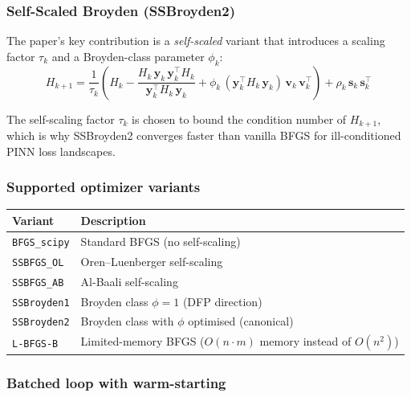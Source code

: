 \documentclass[11pt,a4paper]{article}
\begin{document}
\subsubsection*{Self-Scaled Broyden (SSBroyden2)}

The paper's key contribution is a \emph{self-scaled} variant that
introduces a scaling factor $\tau_k$ and a Broyden-class parameter
$\phi_k$:
\begin{equation}
  H_{k+1} = \frac{1}{\tau_k}\!\left(
    H_k
    - \frac{H_k\,\bm{y}_k\,\bm{y}_k^\top H_k}
           {\bm{y}_k^\top H_k\,\bm{y}_k}
    + \phi_k\,(\bm{y}_k^\top H_k\,\bm{y}_k)\,\bm{v}_k\,\bm{v}_k^\top
  \right)
  + \rho_k\,\bm{s}_k\,\bm{s}_k^\top
\label{eq:ssbroyden}
\end{equation}

The self-scaling factor $\tau_k$ is chosen to bound the condition
number of $H_{k+1}$, which is why SSBroyden2 converges faster than
vanilla BFGS for ill-conditioned PINN loss landscapes.

\subsubsection*{Supported optimizer variants}

\begin{center}
\renewcommand{\arraystretch}{1.3}
\begin{tabular}{@{}lp{9cm}@{}}
\toprule
\textbf{Variant} & \textbf{Description} \\
\midrule
\texttt{BFGS\_scipy}  & Standard BFGS (no self-scaling) \\
\texttt{SSBFGS\_OL}   & Oren--Luenberger self-scaling \\
\texttt{SSBFGS\_AB}   & Al-Baali self-scaling \\
\texttt{SSBroyden1}   & Broyden class $\phi=1$ (DFP direction) \\
\texttt{SSBroyden2}   & Broyden class with $\phi$ optimised (canonical) \\
\texttt{L-BFGS-B}     & Limited-memory BFGS ($O(n \cdot m)$ memory instead of $O(n^2)$) \\
\bottomrule
\end{tabular}
\end{center}

\subsubsection*{Batched loop with warm-starting}
\end{document}
